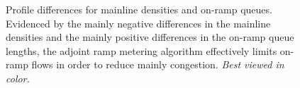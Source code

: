 \begin{figure}
\hfill{}
								
\caption{Profile differences for mainline densities and on-ramp queues. Evidenced
	by the mainly negative differences in the mainline densities and the
	mainly positive differences in the on-ramp queue lengths, the adjoint
	ramp metering algorithm effectively limits on-ramp flows in order to
	reduce mainly congestion. \textit{Best viewed in color.}\label{fig:long-sim}}
\end{figure}
						
